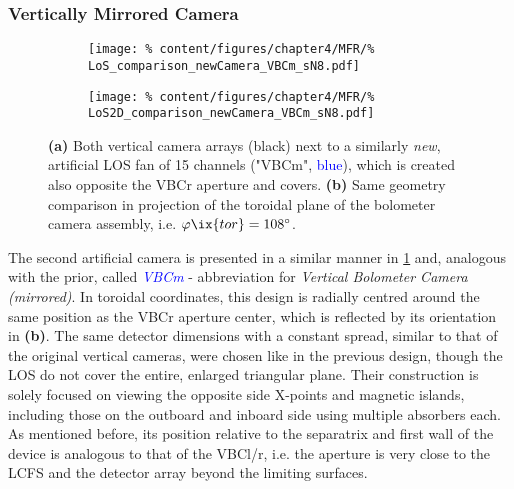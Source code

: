         \subsubsection*{Vertically Mirrored Camera}%
%
            \begin{figure}[t]%
                \centering%
                \begin{subfigure}{0.4\textwidth}%
                    \texttt{[image: \%
                        content/figures/chapter4/MFR/\%
                        LoS\_comparison\_newCamera\_VBCm\_sN8.pdf]}%
                    \caption{}%
                \end{subfigure}%
                \hspace*{0.5cm}%
                \begin{subfigure}{0.5\textwidth}%
                    \texttt{[image: \%
                        content/figures/chapter4/MFR/\%
                        LoS2D\_comparison\_newCamera\_VBCm\_sN8.pdf]}%
                    \caption{}%
                \end{subfigure}%
                \caption{\textbf{(a)} Both vertical camera arrays (black) next to a similarly \textit{new}, artificial LOS fan of 15 channels ("VBCm", \textcolor{blue}{blue}), which is created also opposite the VBCr aperture and covers. \textbf{(b)} Same geometry comparison in projection of the toroidal plane of the bolometer camera assembly, i.e. $\varphi\ix{tor}=108^{\circ}$.}\label{fig:geometry_newcam_vbcm}%
            \end{figure}%
%
            The second artificial camera is presented in a similar manner in \cref{fig:geometry_newcam_vbcm} and, analogous with the prior, called \textit{\textcolor{blue}{VBCm}} - abbreviation for \textit{Vertical Bolometer Camera (mirrored)}. In toroidal coordinates, this design is radially centred around the same position as the VBCr aperture center, which is reflected by its orientation in \textbf{(b)}. The same detector dimensions with a constant spread, similar to that of the original vertical cameras, were chosen like in the previous design, though the LOS do not cover the entire, enlarged triangular plane. Their construction is solely focused on viewing the opposite side X-points and magnetic islands, including those on the outboard and inboard side using multiple absorbers each. As mentioned before, its position relative to the separatrix and first wall of the device is analogous to that of the VBCl/r, i.e. the aperture is very close to the LCFS and the detector array beyond the limiting surfaces.\\%
